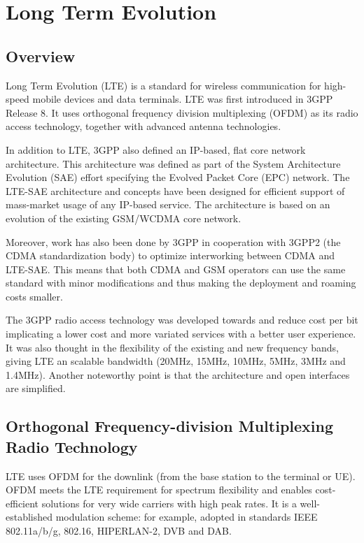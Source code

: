 \chapter{Long Term Evolution}
\label{chap:lte}

\section{Overview}

Long Term Evolution (LTE) is a standard for wireless communication for
high-speed mobile devices and data terminals. LTE was first introduced in 3GPP
Release 8. It uses orthogonal frequency division multiplexing (OFDM) as its
radio access technology, together with advanced antenna technologies.

In addition to LTE, 3GPP also defined an IP-based, flat core network
architecture. This architecture was defined as part of the System Architecture
Evolution (SAE) effort specifying the Evolved Packet Core (EPC) network. The
LTE-SAE architecture and concepts have been designed for efficient support of
mass-market usage of any IP-based service. The architecture is based on an
evolution of the existing GSM/WCDMA core network.%

Moreover, work has also been done by 3GPP in cooperation with 3GPP2 (the CDMA
standardization body) to optimize interworking between CDMA and LTE-SAE. This means
that both CDMA and GSM operators can use the same standard with minor modifications
and thus making the deployment and roaming costs smaller.

The 3GPP radio access technology was developed towards and reduce cost per bit
implicating a lower cost and more variated services with a better user
experience. It was also thought in the flexibility of the existing and new
frequency  bands, giving LTE an scalable bandwidth (20MHz, 15MHz, 10MHz, 5MHz,
3MHz and 1.4MHz). Another noteworthy point is that the architecture and open
interfaces are simplified.

\section{Orthogonal Frequency-division Multiplexing Radio Technology} %

LTE uses OFDM for the downlink (from the base station to the terminal or UE).
OFDM meets the LTE requirement for spectrum flexibility and enables
cost-efficient solutions for very wide carriers with high peak rates. It is a
well-established modulation scheme: for example, adopted in standards IEEE
802.11a/b/g, 802.16, HIPERLAN-2, DVB and DAB.

